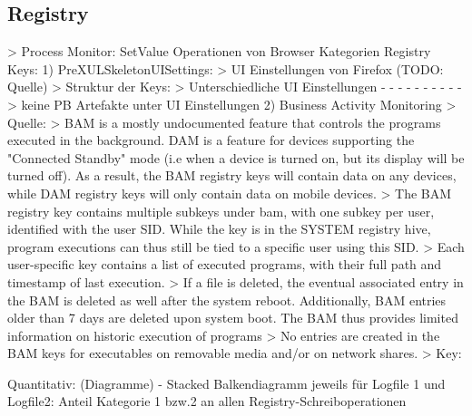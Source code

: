\subsection*{Registry}
> Process Monitor: SetValue Operationen von Browser 
	Kategorien Registry Keys:
	1) PreXULSkeletonUISettings:
		> UI Einstellungen von Firefox (TODO: Quelle) 
		> Struktur der Keys: %
		> Unterschiedliche UI Einstellungen
			- %
			- %
			- %
			- %
			- %
			- %
			- %
			- %
			- %
			- %
		> keine PB Artefakte unter UI Einstellungen	
	2) Business Activity Monitoring %
		> Quelle: %
		> BAM is a mostly undocumented feature that controls the programs executed in the background. DAM is a feature for devices supporting the "Connected Standby" mode (i.e when a device is turned on, but its display will be turned off). As a result, the BAM registry keys will contain data on any devices, while DAM registry keys will only contain data on mobile devices.
		> The BAM registry key contains multiple subkeys under bam\State\UserSettings, with one subkey per user, identified with the user SID. While the key is in the SYSTEM registry hive, program executions can thus still be tied to a specific user using this SID.
		> Each user-specific key contains a list of executed programs, with their full path and timestamp of last execution.
		> If a file is deleted, the eventual associated entry in the BAM is deleted as well after the system reboot. Additionally, BAM entries older than 7 days are deleted upon system boot. The BAM thus provides limited information on historic execution of programs
		> No entries are created in the BAM keys for executables on removable media and/or on network shares.
		> Key: %

Quantitativ: (Diagramme)
	- Stacked Balkendiagramm jeweils für Logfile 1 und Logfile2: Anteil Kategorie 1 bzw.2 an allen Registry-Schreiboperationen

